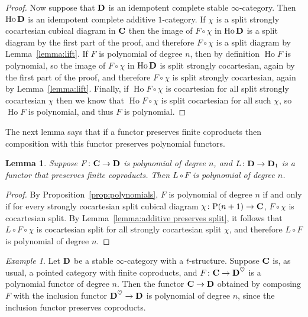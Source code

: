 \documentclass[psamsfonts]{amsart}
\theoremstyle{plain}
\newtheorem{lem}[thm]{Lemma}
\theoremstyle{definition}
\theoremstyle{remark}
\newtheorem{exmp}[thm]{Example}
\newcommand{\catname}[1]{{\normalfont\textbf{#1}}}
\newcommand{\power}{\mathrm{P}}
\DeclareMathOperator{\ho}{Ho}
\begin{document}
\begin{proof}
Now suppose that $\catname{D}$ is an idempotent complete stable $\infty$-category.  Then $\ho \catname{D}$ is an idempotent complete additive $1$-category. If $\chi$ is a split strongly cocartesian cubical diagram in $\catname{C}$ then the image of $F\circ \chi$ in $\ho\catname{D}$ is a split diagram by the first part of the proof, and therefore $F\circ \chi$ is a split diagram by Lemma~\ref{lemma:lift}. If $F$ is polynomial of degree $n$, then by definition $\ho F$ is polynomial, so the image of $F\circ \chi$ in $\ho\catname{D}$ is split strongly cocartesian, again by the first part of the proof, and therefore $F\circ \chi$ is split strongly cocartesian, again by Lemma~\ref{lemma:lift}. Finally, if $\ho F\circ \chi$ is cocartesian for all split strongly cocartesian $\chi$ then we know that $\ho F \circ \chi$ is split cocartesian for all such $\chi$, so $\ho F$ is polynomial, and thus $F$ is polynomial.
\end{proof}
The next lemma says that if a functor preserves finite coproducts then composition with this functor preserves polynomial functors.
\begin{lem}\label{lemma:additive preserves polynomial}
Suppose $F\colon \catname{C}\to \catname{D}$ is polynomial of degree $n$, and $L\colon \catname{D}\to \catname{D}_1$ is a functor that preserves finite coproducts. Then $L\circ F$ is polynomial of degree $n$.
\end{lem}
\begin{proof}
By Proposition~\ref{prop:polynomials}, $F$ is polynomial of degree $n$ if and only if for every strongly cocartesian split cubical diagram $\chi\colon \power(n+1)\to \catname{C}$, $F\circ \chi$ is cocartesian split. By Lemma~\ref{lemma:additive preserves split}, it follows that $L\circ F\circ \chi$ is cocartesian split for all strongly cocartesian split $\chi$, and therefore $L\circ F$ is polynomial of degree $n$.
\end{proof}
\begin{exmp}\label{example:heart}
Let $\catname{D}$ be a stable $\infty$-category with a $t$-structure. Suppose $\catname{C}$ is, as usual, a pointed category with finite coproducts, and $F\colon \catname{C}\to \catname{D}^{\heartsuit}$ is a polynomial functor of degree $n$. Then the functor $\catname{C} \to \catname{D}$ obtained by composing $F$ with the inclusion functor $\catname{D}^{\heartsuit}\to \catname{D}$ is polynomial of degree $n$, since the inclusion functor preserves coproducts.
\end{exmp}
\end{document}
